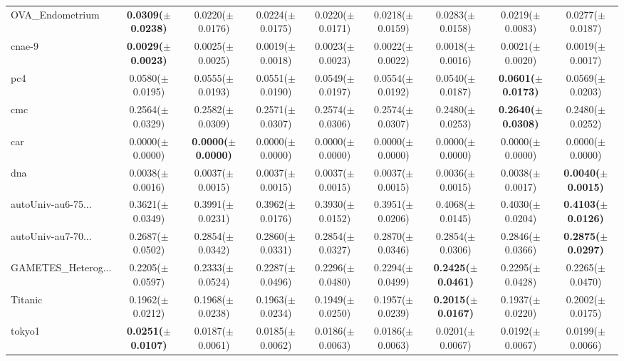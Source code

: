 \begin{longtable}{lcccccccc}
OVA\_Endometrium & \textbf{0.0309($\pm$0.0238)} & 0.0220($\pm$0.0176) & 0.0224($\pm$0.0175) & 0.0220($\pm$0.0171) & 0.0218($\pm$0.0159) & 0.0283($\pm$0.0158) & 0.0219($\pm$0.0083) & 0.0277($\pm$0.0187) \\
cnae-9 & \textbf{0.0029($\pm$0.0023)} & 0.0025($\pm$0.0025) & 0.0019($\pm$0.0018) & 0.0023($\pm$0.0023) & 0.0022($\pm$0.0022) & 0.0018($\pm$0.0016) & 0.0021($\pm$0.0020) & 0.0019($\pm$0.0017) \\
pc4 & 0.0580($\pm$0.0195) & 0.0555($\pm$0.0193) & 0.0551($\pm$0.0190) & 0.0549($\pm$0.0197) & 0.0554($\pm$0.0192) & 0.0540($\pm$0.0187) & \textbf{0.0601($\pm$0.0173)} & 0.0569($\pm$0.0203) \\
cmc & 0.2564($\pm$0.0329) & 0.2582($\pm$0.0309) & 0.2571($\pm$0.0307) & 0.2574($\pm$0.0306) & 0.2574($\pm$0.0307) & 0.2480($\pm$0.0253) & \textbf{0.2640($\pm$0.0308)} & 0.2480($\pm$0.0252) \\
car & 0.0000($\pm$0.0000) & \textbf{0.0000($\pm$0.0000)} & 0.0000($\pm$0.0000) & 0.0000($\pm$0.0000) & 0.0000($\pm$0.0000) & 0.0000($\pm$0.0000) & 0.0000($\pm$0.0000) & 0.0000($\pm$0.0000) \\
dna & 0.0038($\pm$0.0016) & 0.0037($\pm$0.0015) & 0.0037($\pm$0.0015) & 0.0037($\pm$0.0015) & 0.0037($\pm$0.0015) & 0.0036($\pm$0.0015) & 0.0038($\pm$0.0017) & \textbf{0.0040($\pm$0.0015)} \\
autoUniv-au6-75... & 0.3621($\pm$0.0349) & 0.3991($\pm$0.0231) & 0.3962($\pm$0.0176) & 0.3930($\pm$0.0152) & 0.3951($\pm$0.0206) & 0.4068($\pm$0.0145) & 0.4030($\pm$0.0204) & \textbf{0.4103($\pm$0.0126)} \\
autoUniv-au7-70... & 0.2687($\pm$0.0502) & 0.2854($\pm$0.0342) & 0.2860($\pm$0.0331) & 0.2854($\pm$0.0327) & 0.2870($\pm$0.0346) & 0.2854($\pm$0.0306) & 0.2846($\pm$0.0366) & \textbf{0.2875($\pm$0.0297)} \\
GAMETES\_Heterog... & 0.2205($\pm$0.0597) & 0.2333($\pm$0.0524) & 0.2287($\pm$0.0496) & 0.2296($\pm$0.0480) & 0.2294($\pm$0.0499) & \textbf{0.2425($\pm$0.0461)} & 0.2295($\pm$0.0428) & 0.2265($\pm$0.0470) \\
Titanic & 0.1962($\pm$0.0212) & 0.1968($\pm$0.0238) & 0.1963($\pm$0.0234) & 0.1949($\pm$0.0250) & 0.1957($\pm$0.0239) & \textbf{0.2015($\pm$0.0167)} & 0.1937($\pm$0.0220) & 0.2002($\pm$0.0175) \\
tokyo1 & \textbf{0.0251($\pm$0.0107)} & 0.0187($\pm$0.0061) & 0.0185($\pm$0.0062) & 0.0186($\pm$0.0063) & 0.0186($\pm$0.0063) & 0.0201($\pm$0.0067) & 0.0192($\pm$0.0067) & 0.0199($\pm$0.0066) \\

\end{longtable}
